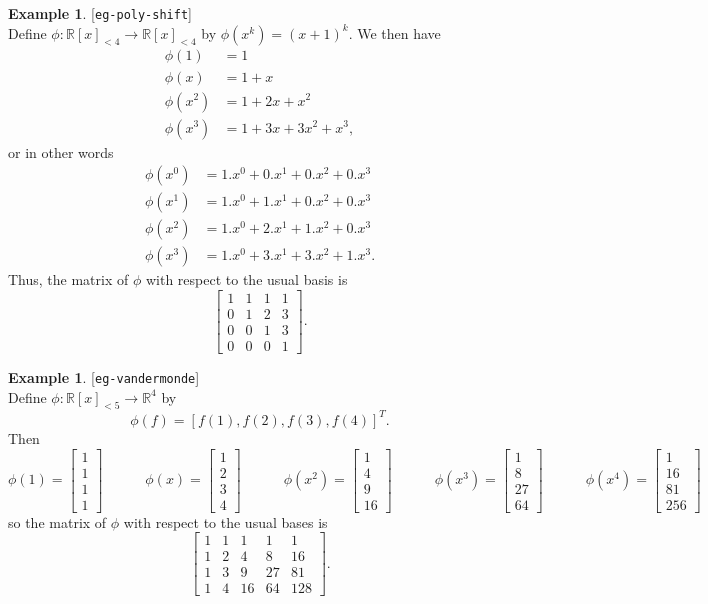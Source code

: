 \documentclass{amsart}
\newcommand{\lbl}[1]{\label{#1}\textup{[\texttt{#1}]}\ \\}
\newcommand{\lbl}{\label}
\newcommand{\R}         {{\mathbb{R}}}
\newcommand{\bsm}       {\left[\begin{smallmatrix}}
\newcommand{\esm}       {\end{smallmatrix}\right]}
\newcommand{\xra}       {\xrightarrow}
\renewcommand{\:}       {\colon}
\theoremstyle{definition}
\newtheorem{example}[theorem]{Example}
\begin{document}
\begin{example}\lbl{eg-poly-shift}
 Define $\phi\:\R[x]_{<4}\xra{}\R[x]_{<4}$ by $\phi(x^k)=(x+1)^k$.
 We then have
 \begin{align*}
   \phi(1) &= 1 \\
   \phi(x) &= 1 + x \\
   \phi(x^2) &= 1 + 2x + x^2 \\
   \phi(x^3) &= 1 + 3x + 3x^2 + x^3,
 \end{align*}
 or in other words
 \begin{align*}
   \phi(x^0) &= 1.x^0 + 0.x^1 + 0.x^2 + 0.x^3 \\
   \phi(x^1) &= 1.x^0 + 1.x^1 + 0.x^2 + 0.x^3 \\
   \phi(x^2) &= 1.x^0 + 2.x^1 + 1.x^2 + 0.x^3 \\
   \phi(x^3) &= 1.x^0 + 3.x^1 + 3.x^2 + 1.x^3.
 \end{align*}
 Thus, the matrix of $\phi$ with respect to the usual basis is 
 \[ \bsm 1 & 1 & 1 & 1 \\ 0 & 1 & 2 & 3 \\
         0 & 0 & 1 & 3 \\ 0 & 0 & 0 & 1 \esm.
 \]
\end{example}

\begin{example}\lbl{eg-vandermonde}
 Define $\phi\:\R[x]_{<5}\xra{}\R^4$ by 
 \[ \phi(f) = [f(1),f(2),f(3),f(4)]^T. \]
 Then
 \[
   \phi(1)   = \bsm 1\\ 1\\ 1\\ 1\esm \hspace{3em}
   \phi(x)   = \bsm 1\\ 2\\ 3\\ 4\esm \hspace{3em}
   \phi(x^2) = \bsm 1\\ 4\\ 9\\ 16\esm \hspace{3em}
   \phi(x^3) = \bsm 1\\ 8\\ 27\\ 64\esm \hspace{3em}
   \phi(x^4) = \bsm 1\\ 16\\ 81\\ 256\esm 
 \]
 so the matrix of $\phi$ with respect to the usual bases is
 \[ \bsm 1 & 1 & 1 & 1 & 1 \\
         1 & 2 & 4 & 8 & 16 \\
         1 & 3 & 9 & 27 & 81 \\
         1 & 4 & 16 & 64 & 128 \esm.
 \]
\end{example}
\end{document}
